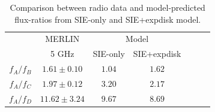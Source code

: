 \documentclass[useAMS,usenatbib]{mn2e}
\begin{document}



\begin{table}
 \centering
  \caption{Comparison between radio data \citep{K03} and model-predicted flux-ratios from SIE-only and SIE+expdisk model.}
  \begin{tabular}{@{}ccccccc}

\hline
	& MERLIN  & \multicolumn{2}{c}{Model}\\
		&5 GHz   & SIE-only & SIE+expdisk \\
\hline
$f_A/f_B$			&$1.61 \pm 0.10$ &$1.04$& $1.62$  \\ 
$f_A/f_C$		&$1.97 \pm 0.12$ 	 &$3.20$ & $2.17$ \\
$f_A/f_D$		&$11.62 \pm 3.24 $  &$9.67$& $8.69$ \\

\hline
\end{tabular}

\medskip
\end{table}

\end{document}
